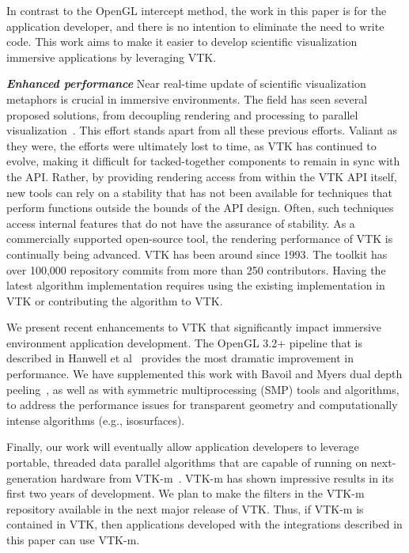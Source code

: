 In contrast to the OpenGL intercept method, the work in this paper is for the application developer, and there is no intention to eliminate the need to write code. This work aims to make  it easier to develop scientific visualization immersive applications by leveraging VTK.

\textit{\textbf{Enhanced performance}} Near real-time update of scientific visualization metaphors is crucial in immersive environments.
The field has seen several proposed solutions, from decoupling rendering and processing to parallel visualization~\cite{Bryson:1996, van2000vista}.
This effort stands apart from all these previous efforts. Valiant
as they were, the efforts were ultimately lost to time, as VTK has continued to
evolve, making it difficult for tacked-together components to remain in
sync with the API.
Rather, by providing rendering access from within the VTK API itself, new
tools can rely on a stability that has not been available for techniques
that perform functions outside the bounds of the API design. Often, such techniques access
internal features that do not have the assurance of stability.
As a commercially supported open-source tool, the rendering performance of VTK is
continually being advanced.
VTK has been around since 1993. The toolkit has over 100,000 repository commits from more than 250 contributors.
Having the latest algorithm implementation requires using the existing implementation in VTK or contributing the algorithm to VTK.

We present recent enhancements to VTK that significantly impact immersive
environment application development. The OpenGL 3.2+ pipeline that is described in Hanwell et al~\cite{Hanwell:2015} provides the most dramatic improvement in performance. We have supplemented this work with Bavoil and Myers dual depth peeling~\cite{Bavoil:2008}, as well as with symmetric multiprocessing (SMP) tools and algorithms, to address the performance issues for transparent geometry and computationally intense algorithms (e.g., isosurfaces).

Finally, our work will eventually allow application developers to leverage portable, threaded data parallel algorithms that are capable of running on next-generation hardware from VTK-m~\cite{Moreland:2016}. VTK-m has shown impressive results in its first two years of development. We plan to make the filters in the VTK-m repository available in the next major release of VTK. Thus, if VTK-m is contained in VTK, then applications developed with the integrations described in this paper can use VTK-m.
